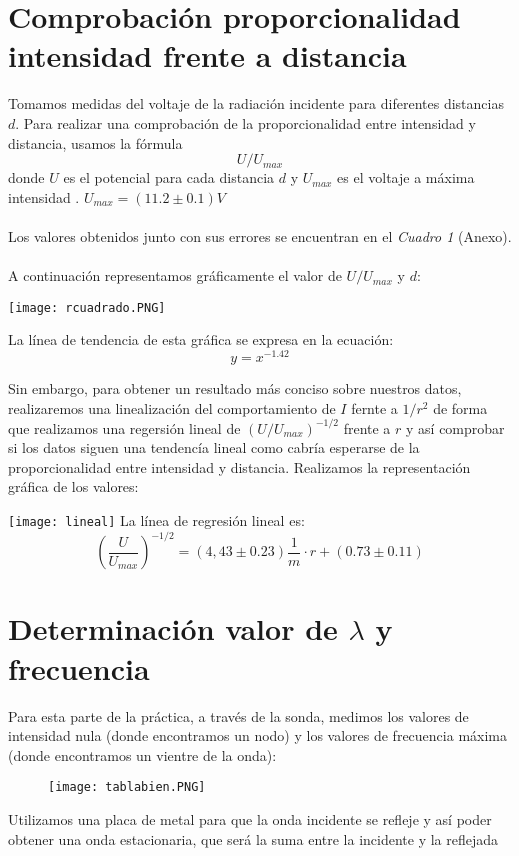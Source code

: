 \documentclass[a4paper,10pt,twocolumns]{article}
\begin{document}
\section{Comprobación proporcionalidad intensidad frente a distancia}
Tomamos medidas del voltaje de la radiación incidente para diferentes distancias $d$. Para  realizar una comprobación de la proporcionalidad entre intensidad y distancia, usamos la fórmula $$U/U_{max}$$ donde $U$ es el potencial para cada distancia $d$ y $U_{max}$ es el voltaje a máxima intensidad . $U_{max}=(11.2 \pm 0.1) V$ \\ 
\\
Los valores obtenidos junto con sus errores se encuentran en el \textit{Cuadro 1} (Anexo).
\\
\\
A continuación representamos gráficamente el valor de $U/U_{max}$ y $d$:


\texttt{[image: rcuadrado.PNG]}

La línea de tendencia de esta gráfica se expresa en la ecuación:
$$\boxed{y=x^{-1.42}}$$

Sin embargo, para obtener un resultado más conciso sobre nuestros datos, realizaremos una linealización del comportamiento de $I$ fernte a $1/r^2$ de forma que realizamos una regersión lineal de $(U/U_{max})^{-1/2}$ frente a $r$ y así comprobar si los datos siguen una tendencía lineal como cabría esperarse de la proporcionalidad entre intensidad y distancia. Realizamos la representación gráfica de los valores:



\texttt{[image: lineal]}
La línea de regresión lineal es: 
\begin{equation}
    \boxed{\left(\frac{U}{U_{max}}\right)^{-1/2}=(4,43 \pm 0.23) \frac{1}{m}\cdot r + (0.73 \pm 0.11)}
\end{equation}


\section{Determinación valor de $\lambda$ y frecuencia}

Para esta parte de la práctica, a través de la sonda, medimos los valores de intensidad nula (donde encontramos un nodo) y los valores de frecuencia máxima (donde encontramos un vientre de la onda):


\begin{figure}[H]
\centering
\texttt{[image: tablabien.PNG]}
\end{figure}
Utilizamos una placa de metal para que la onda incidente se refleje y así poder obtener una onda estacionaria, que será la suma entre la incidente y la reflejada\\
\\
\end{document}
